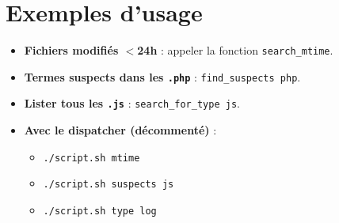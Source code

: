 \documentclass[11pt,a4paper]{article}
\begin{document}
\section{Exemples d'usage}
\begin{itemize}
  \item \textbf{Fichiers modifiés $<$24h} : appeler la fonction \texttt{search\_mtime}.
  \item \textbf{Termes suspects dans les \texttt{.php}} : \texttt{find\_suspects php}.
  \item \textbf{Lister tous les \texttt{.js}} : \texttt{search\_for\_type js}.
  \item \textbf{Avec le dispatcher (décommenté)} :
  \begin{itemize}
    \item \texttt{./script.sh mtime}
    \item \texttt{./script.sh suspects js}
    \item \texttt{./script.sh type log}
  \end{itemize}
\end{itemize}
\end{document}
